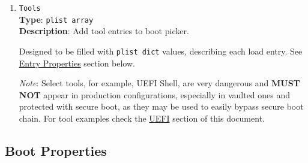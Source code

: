 \documentclass[]{article}
\begin{document}
\begin{enumerate}
\item
  \texttt{Tools}\label{misctools}\\
  \textbf{Type}: \texttt{plist\ array}\\
  \textbf{Description}: Add tool entries to boot picker.

  Designed to be filled with \texttt{plist\ dict} values, describing each load entry.
  See \hyperref[miscentryprops]{Entry Properties} section below.

  \emph{Note}: Select tools, for example, UEFI Shell, are very
  dangerous and \textbf{MUST NOT} appear in production configurations, especially
  in vaulted ones and protected with secure boot, as they may be used to easily
  bypass secure boot chain. For tool examples check the \hyperref[uefitools]{UEFI}
  section of this document.

\end{enumerate}

\subsection{Boot Properties}\label{miscbootprops}
\end{document}
